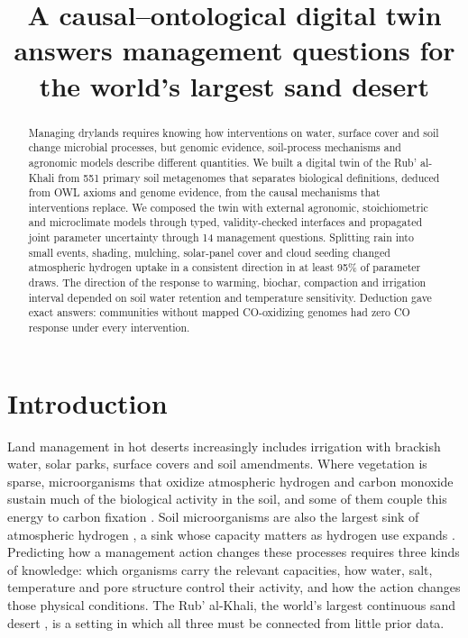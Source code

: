\documentclass[11pt,a4paper]{article}
\title{A causal--ontological digital twin answers management questions for the world's largest sand desert}
\date{}
\begin{document}
\maketitle
\begin{abstract}
Managing drylands requires knowing how interventions on water, surface cover and soil change microbial processes, but genomic evidence, soil-process mechanisms and agronomic models describe different quantities. We built a digital twin of the Rub' al-Khali from 551 primary soil metagenomes that separates biological definitions, deduced from OWL axioms and genome evidence, from the causal mechanisms that interventions replace. We composed the twin with external agronomic, stoichiometric and microclimate models through typed, validity-checked interfaces and propagated joint parameter uncertainty through 14 management questions. Splitting rain into small events, shading, mulching, solar-panel cover and cloud seeding changed atmospheric hydrogen uptake in a consistent direction in at least 95\% of parameter draws. The direction of the response to warming, biochar, compaction and irrigation interval depended on soil water retention and temperature sensitivity. Deduction gave exact answers: communities without mapped CO-oxidizing genomes had zero CO response under every intervention.
\end{abstract}

\section{Introduction}
Land management in hot deserts increasingly includes irrigation with brackish water, solar parks, surface covers and soil amendments. Where vegetation is sparse, microorganisms that oxidize atmospheric hydrogen and carbon monoxide sustain much of the biological activity in the soil, and some of them couple this energy to carbon fixation \cite{ji2017atmospheric,leung2020energetic,jordaan2020gobi}. Soil microorganisms are also the largest sink of atmospheric hydrogen \cite{ehhalt2009h2cycle}, a sink whose capacity matters as hydrogen use expands \cite{ocko2022hydrogen,warwick2023atmospheric}. Predicting how a management action changes these processes requires three kinds of knowledge: which organisms carry the relevant capacities, how water, salt, temperature and pore structure control their activity, and how the action changes those physical conditions. The Rub' al-Khali, the world's largest continuous sand desert \cite{nasaRubAlKhali}, is a setting in which all three must be connected from little prior data.
\end{document}
